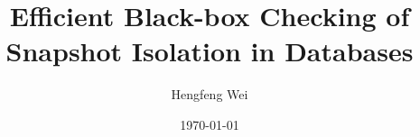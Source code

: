 \documentclass[]{beamer}
\title[]{Efficient Black-box Checking of Snapshot Isolation in Databases}
\subtitle{\teal{(Conference VLDB'2024)}}
\author[Hengfeng Wei]{Hengfeng Wei}
\institute{hfwei@nju.edu.cn}
\date{\today}
\begin{document}
\maketitle






\thankyou{}
\end{document}
